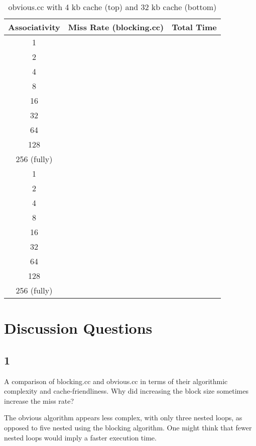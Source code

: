 \documentclass[letterpaper, 12pt, oneside]{memoir}
\begin{document}
\begin{table}[H]
\centering
\begin{tabular}{c|c|c}
    Associativity & Miss Rate (blocking.cc) & Total Time \\ \hline
    1           & & \\
    2           & & \\
    4           & & \\
    8           & & \\
    16          & & \\
    32          & & \\
    64          & & \\
    128         & & \\
    256 (fully) & & \\ \hline
    1           & & \\
    2           & & \\
    4           & & \\
    8           & & \\
    16          & & \\
    32          & & \\
    64          & & \\
    128         & & \\
    256 (fully) & & \\
\end{tabular}
\caption{obvious.cc with 4 kb cache (top) and 32 kb cache (bottom)}
\end{table}

\section{Discussion Questions}
\subsection{1}
A comparison of blocking.cc and obvious.cc in terms of their algorithmic 
complexity and cache-friendliness. Why did increasing the block size sometimes 
increase the miss rate?

The obvious algorithm appears less complex, with only three nested loops, as
opposed to five nested using the blocking algorithm. One might think that
fewer nested loops would imply a faster execution time. 
\end{document}
